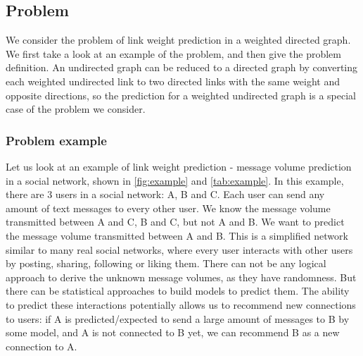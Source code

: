 \documentclass{article}
\begin{document}
\subsection{Problem}
We consider the problem of link weight prediction in a weighted directed graph.
We first take a look at an example of the problem,
and then give the problem definition.
An undirected graph can be reduced to a directed graph by converting each weighted undirected link to two directed links with the same weight and opposite directions,
so the prediction for a weighted undirected graph is a special case of the problem we consider.

\subsubsection{Problem example}
Let us look at an example of link weight prediction - message volume prediction in a social network, shown in \autoref{fig:example} and \autoref{tab:example}.
In this example, there are 3 users in a social network: A, B and C.
Each user can send any amount of text messages to every other user.
We know the message volume transmitted between A and C, B and C, but not A and B.
We want to predict the message volume transmitted between A and B.
This is a simplified network similar to many real social networks, where every user interacts with other users by posting, sharing, following or liking them.
There can not be any logical approach to derive the unknown message volumes,
as they have randomness.
But there can be statistical approaches to build models to predict them.
The ability to predict these interactions potentially allows us to recommend new connections to users:
if A is predicted/expected to send a large amount of messages to B by some model,
and A is not connected to B yet,
we can recommend B as a new connection to A.
\end{document}

